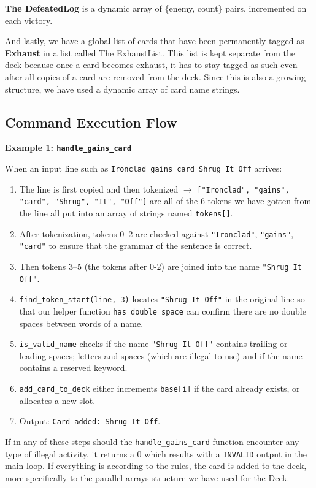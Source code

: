 \documentclass[12pt,a4paper]{article}
\begin{document}
\textbf{The DefeatedLog} is a dynamic array of \{enemy, count\} pairs, incremented on each victory.

And lastly, we have a global list of cards that have been permanently tagged as \textbf{Exhaust} in a list called The ExhaustList. This list is kept separate from the deck because once a card becomes exhaust, it has to stay tagged as such even after all copies of a card are removed from the deck. Since this is also a growing structure, we have used a dynamic array of card name strings.

\subsection{Command Execution Flow}

\textbf{Example 1: \texttt{handle\_gains\_card}}

When an input line such as \texttt{Ironclad gains card Shrug It Off} arrives:

\begin{enumerate}
    \item The line is first copied and then tokenized $\rightarrow$ \texttt{["Ironclad", "gains", "card", "Shrug", "It", "Off"]} are all of the 6 tokens we have gotten from the line all put into an array of strings named \texttt{tokens[]}.
    \item After tokenization, tokens 0--2 are checked against \texttt{"Ironclad"}, \texttt{"gains"}, \texttt{"card"} to ensure that the grammar of the sentence is correct.
    \item Then tokens 3--5 (the tokens after 0-2) are joined into the name \texttt{"Shrug It Off"}.
    \item \texttt{find\_token\_start(line, 3)} locates \texttt{"Shrug It Off"} in the original line so that our helper function \texttt{has\_double\_space} can confirm there are no double spaces between words of a name.
    \item \texttt{is\_valid\_name} checks if the name \texttt{"Shrug It Off"} contains trailing or leading spaces; letters and spaces (which are illegal to use) and if the name contains a reserved keyword.
    \item \texttt{add\_card\_to\_deck} either increments \texttt{base[i]} if the card already exists, or allocates a new slot.
    \item Output: \texttt{Card added: Shrug It Off}.
\end{enumerate}

If in any of these steps should the \texttt{handle\_gains\_card} function encounter any type of illegal activity, it returns a 0 which results with a \texttt{INVALID} output in the main loop. If everything is according to the rules, the card is added to the deck, more specifically to the parallel arrays structure we have used for the Deck.
\end{document}
